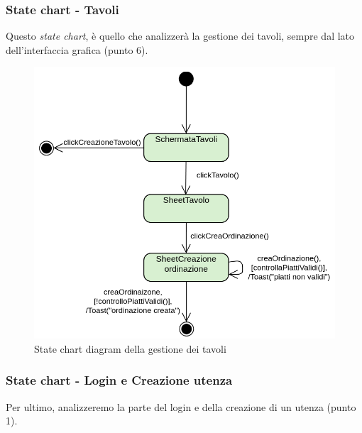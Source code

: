 \subsubsection{State chart - Tavoli}
Questo \textit{state chart}, è quello che analizzerà la gestione dei tavoli, sempre dal lato dell'interfaccia grafica (punto 6).
\begin{figure}[H]
  \centering
  \includegraphics[scale=0.6]{img/stateChart/gestioneTavoli_state_chart.png}
  \caption{State chart diagram della gestione dei tavoli}
\end{figure}  
\newpage
\subsubsection{State chart - Login e Creazione utenza}
Per ultimo, analizzeremo la parte del login e della creazione di un utenza (punto 1).
